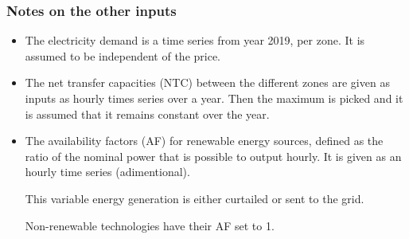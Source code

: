 \subsubsection{Notes on the other inputs}

\begin{itemize}
    \item The electricity demand is a time series from year 2019, per zone. It is assumed to be independent of the price.
    \item The net transfer capacities (NTC) between the different zones are given as inputs as hourly times series over a year. Then the maximum is picked and it is assumed that it remains constant over the year. 
    \item The availability factors (AF) for renewable energy sources, defined as the ratio of the nominal power that is possible to output hourly. It is given as an hourly time series (adimentional).
    
    This variable energy generation is either curtailed or sent to the grid.

    Non-renewable technologies have their AF set to 1.
\end{itemize}
